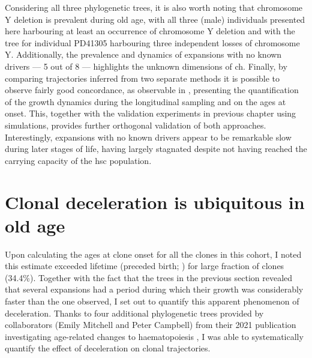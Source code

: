 Considering all three phylogenetic trees, it is also worth noting that chromosome Y deletion is prevalent during old age, with all three (male) individuals presented here harbouring at least an occurrence of chromosome Y deletion and with the tree for individual PD41305 harbouring three independent losses of chromosome Y. Additionally, the prevalence and dynamics of expansions with no known drivers --- 5 out of 8 --- highlights the unknown dimensions of \ac{ch}. Finally, by comparing trajectories inferred from two separate methods it is possible to observe fairly good concordance, as observable in , presenting the quantification of the growth dynamics during the longitudinal sampling and on the ages at onset. This, together with the validation experiments in previous chapter using simulations, provides further orthogonal validation of both approaches. Interestingly, expansions with no known drivers appear to be remarkable slow during later stages of life, having largely stagnated despite not having reached the carrying capacity of the \ac{hsc} population.

\begin{figure}[!ht]
	\label{fig:trees-coefficients-ages-at-onset}
\end{figure}

\section{Clonal deceleration is ubiquitous in old age}

Upon calculating the ages at clone onset for all the clones in this cohort, I noted this estimate exceeded lifetime (preceded birth; ) for large fraction of clones (34.4\%). Together with the fact that the trees in the previous section revealed that several expansions had a period during which their growth was considerably faster than the one observed, I set out to quantify this apparent phenomenon of deceleration. Thanks to four additional phylogenetic trees provided by collaborators (Emily Mitchell and Peter Campbell) from their 2021 publication investigating age-related changes to haematopoiesis \cite{Mitchell2021-zl}, I was able to systematically quantify the effect of deceleration on clonal trajectories.

